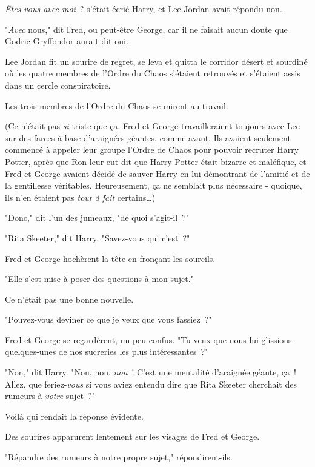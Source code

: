 \emph{Êtes-vous avec moi}~? s'était écrié Harry, et Lee Jordan avait répondu non.

"\emph{Avec} nous," dit Fred, ou peut-être George, car il ne faisait aucun doute que Godric Gryffondor aurait dit oui.

Lee Jordan fit un sourire de regret, se leva et quitta le corridor désert et sourdiné où les quatre membres de l'Ordre du Chaos s'étaient retrouvés et s'étaient assis dans un cercle conspiratoire.

Les trois membres de l'Ordre du Chaos se mirent au travail.

(Ce n'était pas \emph{si} triste que ça. Fred et George travailleraient toujours avec Lee sur des farces à base d'araignées géantes, comme avant. Ils avaient seulement commencé à appeler leur groupe l'Ordre de Chaos pour pouvoir recruter Harry Potter, après que Ron leur eut dit que Harry Potter était bizarre et maléfique, et Fred et George avaient décidé de sauver Harry en lui démontrant de l'amitié et de la gentillesse véritables. Heureusement, ça ne semblait plus nécessaire - quoique, ils n'en étaient pas \emph{tout à fait} certains…)

"Donc," dit l'un des jumeaux, "de quoi s'agit-il~?"

"Rita Skeeter," dit Harry. "Savez-vous qui c'est~?"

Fred et George hochèrent la tête en fronçant les sourcils.

"Elle s'est mise à poser des questions à mon sujet."

Ce n'était pas une bonne nouvelle.

"Pouvez-vous deviner ce que je veux que vous fassiez~?"

Fred et George se regardèrent, un peu confus. "Tu veux que nous lui glissions quelques-unes de nos sucreries les plus intéressantes~?"

"Non," dit Harry. "Non, non, \emph{non}~! C'est une mentalité d'araignée géante, ça~! Allez, que feriez-\emph{vous} si vous aviez entendu dire que Rita Skeeter cherchait des rumeurs à \emph{votre} sujet~?"

Voilà qui rendait la réponse évidente.

Des sourires apparurent lentement sur les visages de Fred et George.

"Répandre des rumeurs à notre propre sujet," répondirent-ils.

